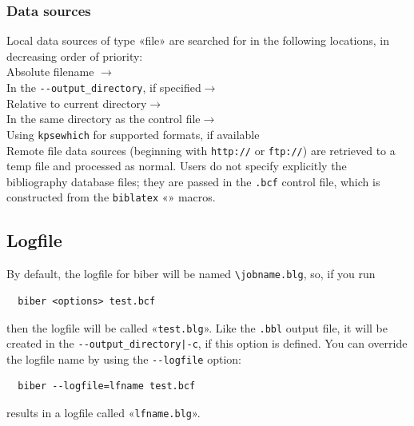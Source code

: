 \documentclass{ltxdockit}
\begin{document}
\subsubsection{Data sources}

Local data sources of type «file» are searched for in the following
locations, in decreasing order of priority:\\[2ex]

\noindent Absolute filename $\rightarrow$\\
\hspace*{1em}In the \verb+--output_directory+, if specified$\rightarrow$\\
\hspace*{2em}Relative to current directory$\rightarrow$\\
\hspace*{3em}In the same directory as the control file$\rightarrow$\\
\hspace*{4em}Using \verb+kpsewhich+ for supported formats, if available\\[2ex]

\noindent Remote file data sources (beginning with \verb+http://+ or
\verb+ftp://+) are retrieved to a temp file and processed as normal. Users
do not specify explicitly the bibliography database files; they are passed
in the \verb+.bcf+ control file, which is constructed from the
\verb+biblatex+ «\verb++» macros.

\subsection{Logfile}

By default, the logfile for biber will be named \verb+\jobname.blg+,
so, if you run

\begin{verbatim}
  biber <options> test.bcf
\end{verbatim}

\noindent then the logfile will be called «\verb+test.blg+». Like the
\verb+.bbl+ output file, it will be created in the
\verb+--output_directory|-c+, if this option is defined. You can
override the logfile name by using the \verb+--logfile+ option:

\begin{verbatim}
  biber --logfile=lfname test.bcf
\end{verbatim}

\noindent results in a logfile called «\verb+lfname.blg+».\\
\end{document}
